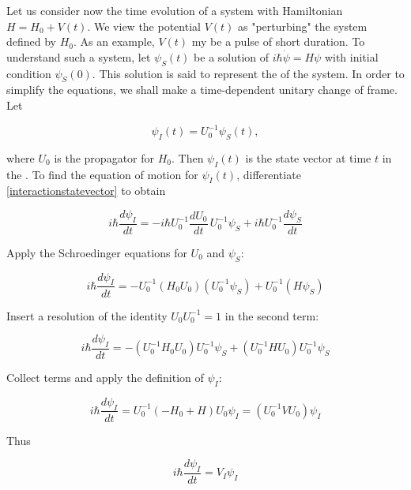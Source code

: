 Let us consider now the time evolution of a system with Hamiltonian $H = H_0 + V(t)$.  We view the potential $V(t)$ as "perturbing" the system defined by $H_0$.  As an example, $V(t)$ my be a pulse of short duration.  To understand such a system, let $\psi_S(t)$ be a solution of $i\hbar \dot \psi = H\psi$ with initial condition $\psi_S(0)$. This solution is said to represent the   of the system.  In order to simplify the equations, we shall make a time-dependent unitary change of frame. Let

\begin{equation}
\label{interactionstatevector}
\psi_I(t) = U_0^{-1}\psi_S(t),
\end{equation}

where $U_0$ is the propagator for $H_0$.  Then $\psi_I(t)$ is the state vector at time $t$  in the .   To find the equation of motion for $\psi_I(t)$, differentiate \eqref{interactionstatevector} to obtain

\begin{equation}
i\hbar\frac{d\psi_I}{dt} = -i\hbar U_0^{-1}\frac{dU_0}{dt}\, U_0^{-1} \psi_S+ i\hbar U_0^{-1} \frac{d\psi_S}{dt}
\end{equation}

Apply the Schroedinger equations for $U_0$ and $\psi_S$:

\begin{equation}
i\hbar\frac{d\psi_I}{dt} =   -U_0^{-1}(H_0U_0) (U_0^{-1} \psi_S )+ U_0^{-1} (H\psi_S)
\end{equation}

Insert a resolution of the identity $U_0U_0^{-1} = 1$ in the second term:

\begin{equation}
i\hbar\frac{d\psi_I}{dt} =   -( U_0^{-1} H_0U_0 ) U_0^{-1} \psi_S + (U_0^{-1} HU_0 ) U_0^{-1}\psi_S
\end{equation}

Collect terms and apply the definition of $\psi_I$:

\begin{equation}
i\hbar\frac{d\psi_I}{dt} =  U_0^{-1}(-H_0 + H)U_0\psi_I = (U_0^{-1}VU_0)\psi_I
\end{equation}

Thus

\begin{equation}
\label{interactionequation}
i\hbar\frac{d\psi_I}{dt} =  V_I\psi_I
\end{equation}

